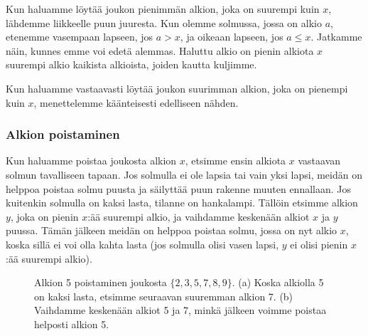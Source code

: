Kun haluamme löytää joukon pienimmän alkion,
joka on suurempi kuin $x$,
lähdemme liikkeelle puun juuresta.
Kun olemme solmussa, jossa on alkio $a$,
etenemme vasempaan lapseen,
jos $a>x$, ja oikeaan lapseen, jos $a \le x$.
Jatkamme näin, kunnes emme voi edetä alemmas.
Haluttu alkio on pienin alkiota $x$ suurempi alkio
kaikista alkioista, joiden kautta kuljimme.

Kun haluamme vastaavasti löytää joukon suurimman alkion,
joka on pienempi kuin $x$,
menettelemme käänteisesti edelliseen nähden.

\subsubsection{Alkion poistaminen}

Kun haluamme poistaa joukosta alkion $x$, etsimme ensin
alkiota $x$ vastaavan solmun tavalliseen tapaan.
Jos solmulla ei ole lapsia tai vain yksi lapsi,
meidän on helppoa poistaa solmu puusta ja säilyttää
puun rakenne muuten ennallaan.
Jos kuitenkin solmulla on kaksi lasta,
tilanne on hankalampi.
Tällöin etsimme alkion $y$,
joka on pienin $x$:ää suurempi alkio,
ja vaihdamme keskenään alkiot $x$ ja $y$ puussa.
Tämän jälkeen meidän on helppoa poistaa solmu,
jossa on nyt alkio $x$,
koska sillä ei voi olla kahta lasta
(jos solmulla olisi vasen lapsi,
$y$ ei olisi pienin $x$:ää suurempi alkio).

\begin{figure}
\center
{}
\caption{Alkion 5 poistaminen joukosta $\{2,3,5,7,8,9\}$. (a) Koska alkiolla
5 on kaksi lasta, etsimme seuraavan suuremman alkion 7.
(b) Vaihdamme keskenään alkiot 5 ja 7, minkä jälkeen voimme poistaa helposti alkion 5.}
\label{fig:bihpu3}
\end{figure}


